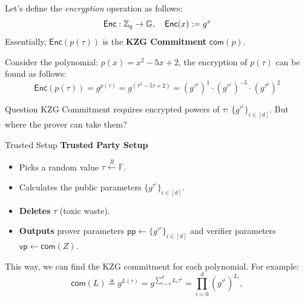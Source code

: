 \documentclass{zkdl-presentation-template}
\begin{document}
    \begin{frame}
        Let's define the \textit{encryption} operation as follows:
        \vspace{-10pt}
        \begin{equation*}
            \mathsf{Enc}: \mathbb{Z}_q \to \mathbb{G}, \quad \mathsf{Enc}(x) := g^x
            \vspace{-5pt}
        \end{equation*}\pause
        Essentially, $\mathsf{Enc}(p(\tau))$ is the \textbf{KZG Commitment} $\mathsf{com}(p)$. 
        \begin{example}
            Consider the polynomial: $p(x) = x^2 - 5x + 2$, the encryption of $p(\tau)$ can be found as follows:
            {\large
            \begin{equation*}
                \mathsf{Enc}(p(\tau)) = g^{p(\tau)} = g^{\left( \tau^2 - 5\tau + 2 \right)}  = \left( g^{\tau^2} \right)^1 \cdot {\left( g^{\tau^1} \right)}^{-5} \cdot \left(g^{\tau^0}\right)^2
            \end{equation*}}
        \end{example}\pause
        \begin{alertblock}{Question}
            KZG Commitment requires encrypted powers of $\tau$: $\{g^{\tau^i}\}_{i \in [d]}$. But 
            where the prover can take them?
        \end{alertblock}
    \end{frame}

    \begin{frame}{Trusted Setup}
        \textbf{Trusted Party Setup}
        \vspace{-5pt}
        \begin{itemize}[label=]
            \item \vspace{-3pt} Picks a random value $\tau \xleftarrow{R} \mathbb{F}$. \pause
            \item \vspace{-3pt} Calculates the public parameters $\{g^{\tau^i}\}_{i \in [d]}$.\pause
            \item \vspace{-3pt} \textbf{Deletes} $\tau$ (toxic waste).\pause
            \item \vspace{-3pt} \textbf{Outputs} prover parameters $\mathsf{pp} \gets \{g^{\tau^i}\}_{i \in [d]}$ and verifier parameters $\mathsf{vp} \gets \mathsf{com}(Z)$. \pause
        \end{itemize} \pause

        This way, we can find the KZG commitment for each polynomial. For example:
        \begin{equation*}
            \mathsf{com}(L) \triangleq g^{L(\tau)} = g^{\sum_{i=0}^d L_i \tau^i} = \prod_{i=0}^d (g^{\tau^i})^{L_i},
        \end{equation*}
    \end{frame}
\end{document}
